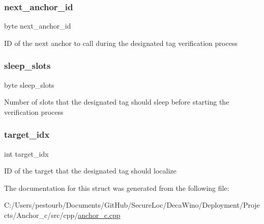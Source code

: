 \subsubsection{\texorpdfstring{next\+\_\+anchor\+\_\+id}{next\_anchor\_id}}
{\footnotesize\ttfamily byte next\+\_\+anchor\+\_\+id}

ID of the next anchor to call during the designated tag verification process \mbox{\label{structcontrol__frame_a669b7e13ef545f7ac9e46bc794b87c63}} 
\subsubsection{\texorpdfstring{sleep\+\_\+slots}{sleep\_slots}}
{\footnotesize\ttfamily byte sleep\+\_\+slots}

Number of slots that the designated tag should sleep before starting the verification process \mbox{\label{structcontrol__frame_a7c74492e7941ff4d6d2697ab892f4fe7}} 
\subsubsection{\texorpdfstring{target\+\_\+idx}{target\_idx}}
{\footnotesize\ttfamily int target\+\_\+idx}

ID of the target that the designated tag should localize 

The documentation for this struct was generated from the following file\+:\begin{DoxyCompactItemize}
\item 
C\+:/\+Users/pestourb/\+Documents/\+Git\+Hub/\+Secure\+Loc/\+Deca\+Wino/\+Deployment/\+Projects/\+Anchor\+\_\+c/src/cpp/\mbox{\hyperlink{anchor__c_8cpp}{anchor\+\_\+c.\+cpp}}\end{DoxyCompactItemize}
